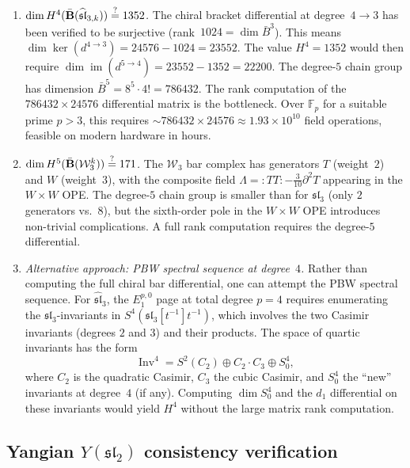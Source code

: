 \begin{enumerate}[label=\textbf{NF-\arabic*$'$.}, leftmargin=3em]
\item \emph{$\dim H^4(\bar{\mathbf{B}}(\widehat{\mathfrak{sl}}_{3,k}))
\stackrel{?}{=} 1352$.}
The chiral bracket differential at degree~$4 \to 3$ has been verified
to be surjective (rank~$1024 = \dim \bar{B}^3$).
This means $\dim \ker(d^{4 \to 3}) = 24576 - 1024 = 23552$.
The value $H^4 = 1352$ would then require
$\dim \operatorname{im}(d^{5 \to 4}) = 23552 - 1352 = 22200$.
The degree-$5$ chain group has dimension
$\bar{B}^5 = 8^5 \cdot 4! = 786432$.
The rank computation of the $786432 \times 24576$ differential matrix
is the bottleneck.  Over $\mathbb{F}_p$ for a suitable prime $p > 3$,
this requires $\sim 786432 \times 24576 \approx 1.93 \times 10^{10}$
field operations, feasible on modern hardware in hours.

\item \emph{$\dim H^5(\bar{\mathbf{B}}(\mathcal{W}_3^k))
\stackrel{?}{=} 171$.}
The $\mathcal{W}_3$ bar complex has generators $T$ (weight~$2$) and
$W$ (weight~$3$), with the composite field $\Lambda = {:}TT{:} -
\tfrac{3}{10}\partial^2 T$ appearing in the $W \times W$ OPE.
The degree-$5$ chain group is smaller than for $\mathfrak{sl}_3$
(only $2$ generators vs.~$8$), but the sixth-order pole in the
$W \times W$ OPE introduces non-trivial complications.
A full rank computation requires the degree-$5$ differential.

\item \emph{Alternative approach: PBW spectral sequence at degree~$4$.}
Rather than computing the full chiral bar differential, one can
attempt the PBW spectral sequence.  For $\widehat{\mathfrak{sl}}_3$,
the $E_1^{p,0}$ page at total degree $p = 4$ requires enumerating
the $\mathfrak{sl}_3$-invariants in
$S^4(\mathfrak{sl}_3[t^{-1}]t^{-1})$, which involves the two Casimir
invariants (degrees $2$ and $3$) and their products.  The space of
quartic invariants has the form
\[
\operatorname{Inv}^4 = S^2(C_2) \oplus C_2 \cdot C_3 \oplus S^4_0,
\]
where $C_2$ is the quadratic Casimir, $C_3$ the cubic Casimir,
and $S^4_0$ the ``new'' invariants at degree~$4$ (if any).
Computing $\dim S^4_0$ and the $d_1$ differential on these invariants
would yield $H^4$ without the large matrix rank computation.
\end{enumerate}

\subsection{Yangian $Y(\mathfrak{sl}_2)$ consistency verification}
\label{subsec:yangian-h4-verification}

